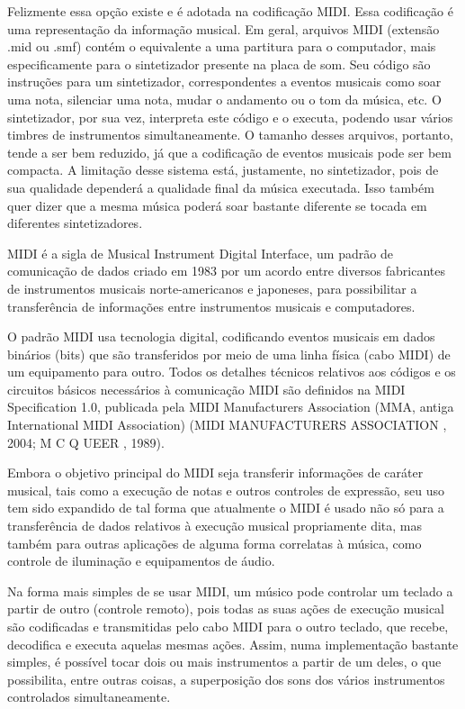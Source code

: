 Felizmente essa opção existe e é adotada na codificação MIDI. Essa codificação é uma representação da informação musical. Em geral, arquivos MIDI (extensão .mid ou .smf) contém o equivalente a uma partitura para o computador, mais especificamente para o sintetizador presente na placa de som. Seu código são instruções para um sintetizador, correspondentes a eventos musicais como soar uma nota, silenciar uma nota, mudar o andamento ou o tom da música, etc. O sintetizador, por sua vez, interpreta este código e o executa, podendo usar vários timbres de instrumentos simultaneamente. O tamanho desses arquivos, portanto, tende a ser bem reduzido, já que a codificação de
eventos musicais pode ser bem compacta. A limitação desse sistema está, justamente, no sintetizador, pois de sua qualidade dependerá a qualidade final da música executada. Isso também quer dizer que a mesma música poderá soar bastante diferente se tocada em diferentes sintetizadores.

MIDI é a sigla de Musical Instrument Digital Interface, um padrão de comunicação de dados criado em 1983 por um acordo entre diversos fabricantes de instrumentos musicais norte-americanos e japoneses, para possibilitar a transferência de informações entre instrumentos musicais e computadores.

O padrão MIDI usa tecnologia digital, codificando eventos musicais em dados binários (bits) que são transferidos por meio de uma linha física (cabo MIDI) de um equipamento para outro. Todos os detalhes técnicos relativos aos códigos e os circuitos básicos necessários à comunicação MIDI são definidos na MIDI Specification 1.0, publicada pela MIDI Manufacturers Association (MMA, antiga International MIDI Association) (MIDI MANUFACTURERS ASSOCIATION , 2004; M C Q UEER , 1989).

Embora o objetivo principal do MIDI seja transferir informações de caráter musical, tais como a execução de notas e outros controles de expressão, seu uso tem sido expandido de tal forma que atualmente o MIDI é usado não só para a transferência de dados relativos à execução musical propriamente dita, mas também para outras aplicações de alguma forma correlatas à música, como controle de iluminação e equipamentos de áudio.

Na forma mais simples de se usar MIDI, um músico pode controlar um teclado a partir de outro (controle remoto), pois todas as suas ações de execução musical são codificadas e transmitidas pelo cabo MIDI para o outro teclado, que recebe, decodifica e executa aquelas mesmas ações. Assim, numa implementação bastante simples, é possível tocar dois ou mais instrumentos a partir de um deles, o que possibilita, entre outras coisas, a superposição dos sons dos vários instrumentos controlados simultaneamente.

